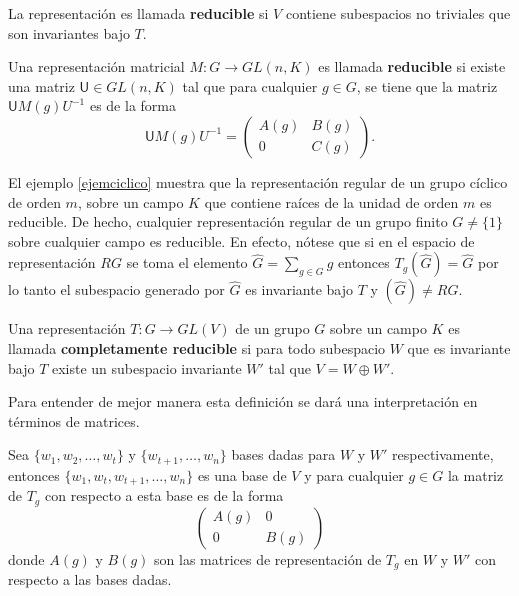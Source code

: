 La representación es llamada \textbf{reducible} si $V$ contiene  subespacios no triviales que son invariantes bajo $T$. 

\begin{definicion}
Una representación matricial $M \colon G \to GL(n,K)$ es llamada \textbf{reducible} si existe una matriz $\mathsf{U} \in GL(n,K)$ tal que para cualquier $g \in G$, se tiene que la matriz $\mathsf{U}M(g)U^{-1}$ es de la forma
\begin{equation*}
\mathsf{U}M(g)U^{-1} = \begin{pmatrix}
A(g) & B(g) \\
0 & C(g)
\end{pmatrix}. 
\end{equation*}  
\end{definicion}

El ejemplo \ref{ejemciclico} muestra que la representación regular de un grupo cíclico de orden $m$, sobre un campo $K$ que contiene raíces de la unidad de orden $m$ es reducible. De hecho, cualquier representación regular de un grupo finito $G \neq \{ 1 \}$ sobre cualquier campo es reducible. En efecto, nótese que si en el espacio de representación $RG$ se toma el elemento $\hat{G} = \sum_{g \in G}g$ entonces $ T_g(\hat{G}) = \hat{G}$ por lo tanto el subespacio generado por $\hat{G}$ es invariante bajo $T$ y $(\hat{G}) \neq RG.$  

\begin{definicion}
Una representación $T \colon G \to GL(V)$ de un grupo $G$ sobre un campo $K$ es llamada \textbf{completamente reducible} si para todo subespacio $W$ que es invariante bajo $T$ existe un subespacio invariante $W'$ tal que $V = W \oplus W'$.
\end{definicion}
Para entender de mejor manera esta definición se dará una interpretación en términos de matrices.

Sea $\{ w_1, w_2, \dots, w_t \}$ y $\{ w_{t+1}, \dots, w_n\}$ bases dadas para $W$ y $W'$ respectivamente, entonces $\{ w_1, w_t, w_{t+1}, \dots, w_n \}$ es una base de $V$ y para cualquier $g \in G$ la matriz de $T_g$ con respecto a esta base es de la forma
\begin{equation*} \begin{pmatrix}
A(g) & 0 \\
0 & B(g)
\end{pmatrix} \end{equation*} donde $A(g)$ y $B(g)$ son las matrices de representación de $T_g$ en $W$ y $W'$ con respecto a las bases dadas. 

